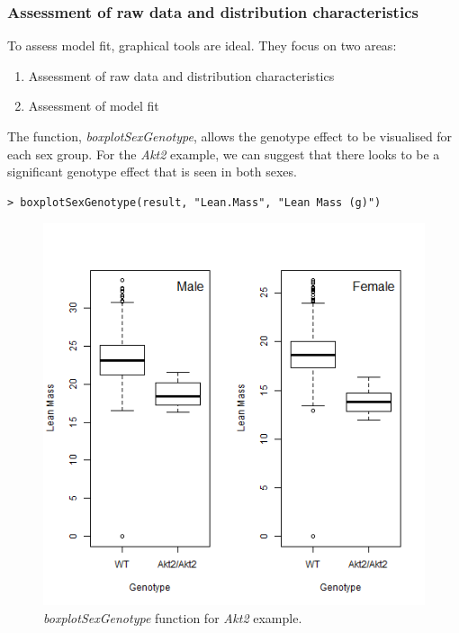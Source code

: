 \documentclass[12pt,a4paper]{article}
\begin{document}
\subsubsection{Assessment of raw data and distribution characteristics}
To assess model fit, graphical tools are ideal.  They focus on two areas:
\begin{enumerate}
 \item Assessment of raw data and distribution characteristics
 \item Assessment of model fit
\end{enumerate}
\label{AssesingModelFit}

The function, \textit{boxplotSexGenotype}, allows the genotype effect to be visualised for each sex group. 
For the \textit{Akt2} example, we can suggest that there looks to be a significant genotype effect that is seen in both sexes. 


\begingroup
    \fontsize{8pt}{12pt}\selectfont
\begin{verbatim}
> boxplotSexGenotype(result, "Lean.Mass", "Lean Mass (g)")
\end{verbatim}
\endgroup 

\begin{figure}[H]%
\centerline{\includegraphics[scale=0.5]{cs1_boxplotSexGenotype.png}}
\caption{\textit{boxplotSexGenotype} function for \textit{Akt2} example.}\label{fig:15}
\end{figure}
\end{document}
